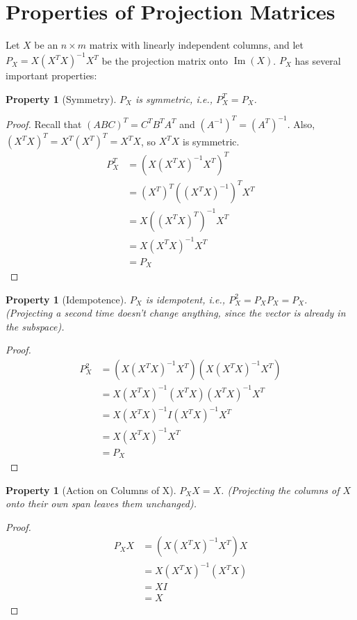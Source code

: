 \documentclass[11pt]{article}
\newtheorem{property}[theorem]{Property}
\theoremstyle{definition}
\DeclareMathOperator{\Image}{Im} %
\begin{document}
\section{Properties of Projection Matrices}

Let $X$ be an $n \times m$ matrix with linearly independent columns, and let $P_X = X(X^T X)^{-1} X^T$ be the projection matrix onto $\Image(X)$. $P_X$ has several important properties:

\begin{property}[Symmetry]
$P_X$ is symmetric, i.e., $P_X^T = P_X$.
\end{property}
\begin{proof}
Recall that $(ABC)^T = C^T B^T A^T$ and $(A^{-1})^T = (A^T)^{-1}$. Also, $(X^T X)^T = X^T (X^T)^T = X^T X$, so $X^T X$ is symmetric.
\begin{align*}
P_X^T &= (X(X^T X)^{-1} X^T)^T \\
&= (X^T)^T ((X^T X)^{-1})^T X^T \\
&= X ((X^T X)^T)^{-1} X^T \\
&= X (X^T X)^{-1} X^T \\
&= P_X
\end{align*}
\end{proof}

\begin{property}[Idempotence]
$P_X$ is idempotent, i.e., $P_X^2 = P_X P_X = P_X$. (Projecting a second time doesn't change anything, since the vector is already in the subspace).
\end{property}
\begin{proof}
\begin{align*}
P_X^2 &= (X(X^T X)^{-1} X^T) (X(X^T X)^{-1} X^T) \\
&= X(X^T X)^{-1} (X^T X) (X^T X)^{-1} X^T \\
&= X(X^T X)^{-1} I (X^T X)^{-1} X^T \\
&= X(X^T X)^{-1} X^T \\
&= P_X
\end{align*}
\end{proof}

\begin{property}[Action on Columns of X]
$P_X X = X$. (Projecting the columns of $X$ onto their own span leaves them unchanged).
\end{property}
\begin{proof}
\begin{align*}
P_X X &= (X(X^T X)^{-1} X^T) X \\
&= X(X^T X)^{-1} (X^T X) \\
&= X I \\
&= X
\end{align*}
\end{proof}
\end{document}
